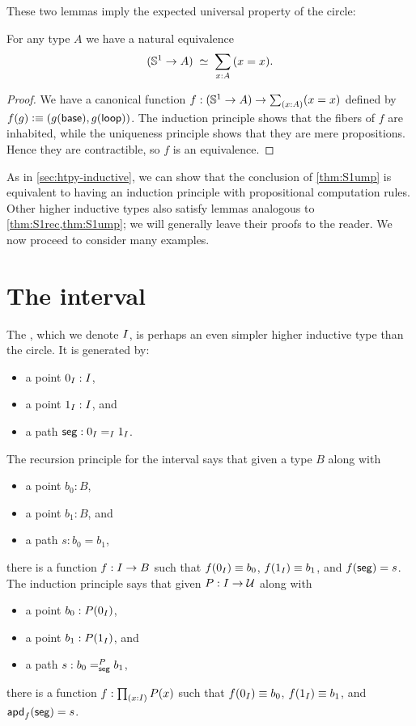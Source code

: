 %
These two lemmas imply the expected universal property of the circle:

\begin{lem}\label{thm:S1ump}
  For any type $A$ we have a natural equivalence
  \[ (\Sn^1 \to A) \;\eqvsym\;
  \sm{x:A} (x=x).
  \]
\end{lem}
\begin{proof}
  We have a canonical function $f:(\Sn^1 \to A) \to \sm{x:A} (x=x)$ defined by $f(g) \defeq (g(\base),\ap g \lloop)$.
  The induction principle shows that the fibers of $f$ are inhabited, while the uniqueness principle shows that they are mere propositions.
  Hence they are contractible, so $f$ is an equivalence.
\end{proof}

%

As in \autoref{sec:htpy-inductive}, we can show that the conclusion of \autoref{thm:S1ump} is equivalent to having an induction principle with propositional computation rules.
Other higher inductive types also satisfy lemmas analogous to \autoref{thm:S1rec,thm:S1ump}; we will generally leave their proofs to the reader.
We now proceed to consider many examples.


\section{The interval}
\label{sec:interval}

%
%
The , which we denote $\interval$, is perhaps an even simpler higher inductive type than the circle.
It is generated by:
\begin{itemize}
\item a point $\izero:\interval$,
\item a point $\ione:\interval$, and
\item a path $\seg : \id[\interval]\izero\ione$.
\end{itemize}
%
The recursion principle for the interval says that given a type $B$ along with
\begin{itemize}
\item a point $b_0:B$,
\item a point $b_1:B$, and
\item a path $s:b_0=b_1$,
\end{itemize}
there is a function $f:\interval\to B$ such that $f(\izero)\jdeq b_0$, $f(\ione)\jdeq b_1$, and $\ap f \seg = s$.
%
The induction principle says that given $P:\interval\to\type$ along with
\begin{itemize}
\item a point $b_0:P(\izero)$,
\item a point $b_1:P(\ione)$, and
\item a path $s:\dpath{P}{\seg}{b_0}{b_1}$,
\end{itemize}
there is a function $f:\prd{x:\interval} P(x)$ such that $f(\izero)\jdeq b_0$, $f(\ione)\jdeq b_1$, and $\apd f \seg = s$.

